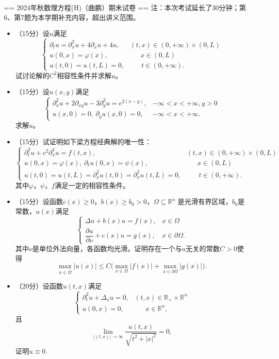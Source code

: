== 2024年秋数理方程(H)（曲鹏）期末试卷 ==
\qquad 注：本次考试延长了30分钟；第6、第7题为本学期补充内容，超出讲义范围。
\begin{itemize}
    \item[1.] （15分）设$u$满足
    $$\begin{cases}
        \partial_tu=\partial_x^2u+4\partial_xu+4u,&(t,x)\in(0,+\infty)\times(0,L)\\
        u(0,x)=\varphi(x),&\quad\;\; x\in(0,L)\\
        u(t,0)=u(t,L)=0,&\quad\ \ \ t\in(0,+\infty).
    \end{cases}$$
    试讨论解的$C^2$相容性条件并求解$u$。

    \item[2.] （15分）设$u(x,y)$满足
    $$\begin{cases}
        \partial_x^2u+2\partial_{xy}u-3\partial_y^2u=e^{2(x-y)},&-\infty<x<+\infty,y>0\\
        u(x,0)=0,\ \partial_yu(x,0)=0,&-\infty<x<+\infty.
    \end{cases}$$
    求解$u$。

    \item[3.] （15分）试证明如下梁方程经典解的唯一性：
    $$\begin{cases}
        \partial_t^2u+c^2\partial_x^4u=f(t,x),&(t,x)\in(0,+\infty)\times(0,L)\\
        u(0,x)=\varphi(x),\ \partial_tu(0,x)=\psi(x),&\quad\;\; x\in(0,L)\\
        u(t,0)=u(t,L)=\partial_x^2u(t,0)=\partial_x^2u(t,L)=0,&\quad\;\;\: t\in(0,+\infty).
    \end{cases}$$
    其中$\varphi$，$\psi$，$f$满足一定的相容性条件。

    \item[4.] （15分）设函数$c(x)\geq0$，$b(x)\geq b_0>0$，$\Omega\subseteq\mathbb{R}^n$
    是光滑有界区域，$b_0$是常数，$u(x)$满足
    $$\begin{cases}
        \Delta u+b(x)u=f(x),&x\in\Omega\\
        \dfrac{\partial u}{\partial \nu}+c(x)u=g(x),&x\in\partial\Omega.
    \end{cases}$$
    其中$\nu$是单位外法向量，各函数均光滑。证明存在一个与$u$无关的常数$C>0$使得
    $$\max\limits_{x\in\overline\Omega}|u(x)|
    \le C\big(\max_{x\in\Omega}|f(x)|+\max_{x\in\partial\Omega}|g(x)|\big).$$

    \item[5.]（20分）设函数$u(t,x)$满足
    $$\begin{cases}
        \partial_t^2u+\Delta_xu=0,&(t,x)\in\mathbb{R}_+\times\mathbb{R}^n\\
        u(0,x)=0,&\quad\;\,\,x\in\mathbb{R}^n,
    \end{cases}$$
    且
    $$\lim_{|(t,x)|\to\infty} \frac{u(t,x)}{\sqrt{t^2+|x|^2}}=0,$$
    证明$u\equiv0$.


\end{itemize}
